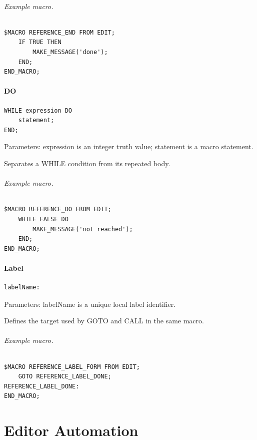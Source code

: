\documentclass[a4paper,10pt,twoside,openany]{book}
\begin{document}
\paragraph{Example macro.}
\begin{verbatim}
$MACRO REFERENCE_END FROM EDIT;
    IF TRUE THEN
        MAKE_MESSAGE('done');
    END;
END_MACRO;
\end{verbatim}

\label{prim:keyword-do}
\subsection*{DO}
\begin{verbatim}
WHILE expression DO
    statement;
END;
\end{verbatim}
Parameters: expression is an integer truth value; statement is a macro statement.

Separates a WHILE condition from its repeated body.

\paragraph{Example macro.}
\begin{verbatim}
$MACRO REFERENCE_DO FROM EDIT;
    WHILE FALSE DO
        MAKE_MESSAGE('not reached');
    END;
END_MACRO;
\end{verbatim}

\label{prim:form-label}
\subsection*{Label}
\begin{verbatim}
labelName:
\end{verbatim}
Parameters: labelName is a unique local label identifier.

Defines the target used by GOTO and CALL in the same macro.

\paragraph{Example macro.}
\begin{verbatim}
$MACRO REFERENCE_LABEL_FORM FROM EDIT;
    GOTO REFERENCE_LABEL_DONE;
REFERENCE_LABEL_DONE:
END_MACRO;
\end{verbatim}


\part{Editor Automation}
\end{document}
